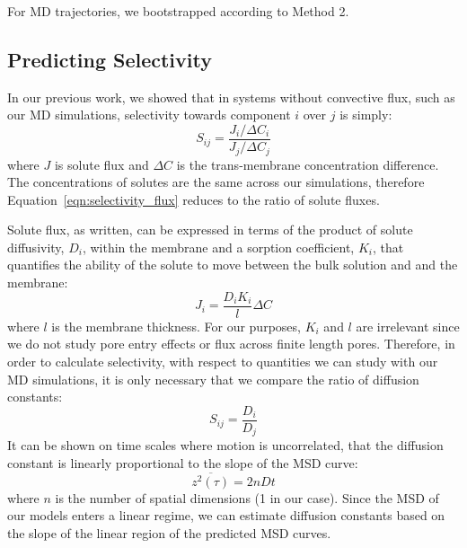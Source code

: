 \documentclass[journal=jpcbfk,manuscript=article]{achemso}
\begin{document}
  For MD trajectories, we bootstrapped according to Method 2.
  
  \subsection{Predicting Selectivity}\label{method:selectivity}
  
  In our previous work, we showed that in systems without convective flux, such
  as our MD simulations, selectivity towards component $i$ over $j$ is simply:
  \begin{equation}
  S_{ij} = \frac{J_i / \Delta C_i}{J_j / \Delta C_j}
  \label{eqn:selectivity_flux}
  \end{equation}
  where $J$ is solute flux and $\Delta C$ is the trans-membrane concentration
  difference.~\cite{coscia_capturing_2020} The concentrations of solutes are the
  same across our simulations, therefore Equation~\ref{eqn:selectivity_flux} 
  reduces to the ratio of solute fluxes. 
  
  Solute flux, as written, can be expressed in terms of the product of solute 
  diffusivity, $D_i$, within the membrane and a sorption coefficient, $K_i$, 
  that quantifies the ability of the solute to move between the bulk solution
  and and the membrane:
  \begin{equation}
    J_i = \frac{D_i K_i}{l}\Delta C
  \end{equation}
  where $l$ is the membrane thickness. For our purposes, $K_i$ and $l$ are 
  irrelevant since we do not study pore entry effects or flux across finite
  length pores. Therefore, in order to calculate selectivity, with respect
  to quantities we can study with our MD simulations, it is only necessary that
  we compare the ratio of diffusion constants:
  \begin{equation}
    S_{ij} = \frac{D_i}{D_j}
    \label{eqn:selectivity_diffusivity}
  \end{equation}
  It can be shown on time scales where motion is uncorrelated, that the diffusion
  constant is linearly proportional to the slope of the MSD curve:~\cite{einstein_investigations_1956}
  \begin{equation}
    \overline{z^2(\tau)} = 2 n D t
    \label{eqn:msd_D}
  \end{equation}
  where $n$ is the number of spatial dimensions (1 in our case). Since the MSD
  of our models enters a linear regime, we can estimate diffusion constants 
  based on the slope of the linear region of the predicted MSD curves. 
\end{document}
